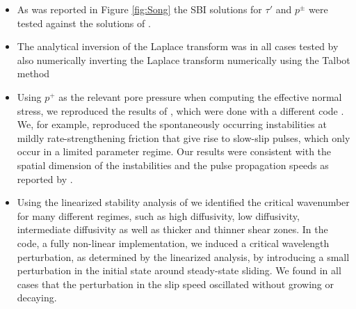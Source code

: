 \documentclass[draft]{agujournal2019}
\begin{document}
\begin{itemize}
    \item As was reported in Figure \ref{fig:Song} the SBI solutions for $\tau'$ and $p^\pm$ were tested against the solutions of \cite{Song2017}.
    \item The analytical inversion of the Laplace transform was in all cases tested by also numerically inverting the Laplace transform numerically using the Talbot method \cite{Talbot1979}
    \item Using $p^+$ as the relevant pore pressure when computing the effective normal stress, we reproduced the results of \cite{Heimisson2019}, which were done with a different code \cite{Torberntsson2018}. We, for example, reproduced the spontaneously occurring instabilities at mildly rate-strengthening friction that give rise to slow-slip pulses, which only occur in a limited parameter regime. Our results were consistent with the spatial dimension of the instabilities and the pulse propagation speeds as reported by \cite{Heimisson2019}.
    \item Using the linearized stability analysis of \cite{Heimisson2021} we identified the critical wavenumber for many different regimes, such as high diffusivity, low diffusivity, intermediate diffusivity as well as thicker and thinner shear zones. In the code, a fully non-linear implementation, we induced a critical wavelength perturbation, as determined by the linearized analysis, by introducing a small perturbation in the initial state around steady-state sliding. We found in all cases that the perturbation in the slip speed oscillated without growing or decaying.
\end{itemize}
\end{document}
